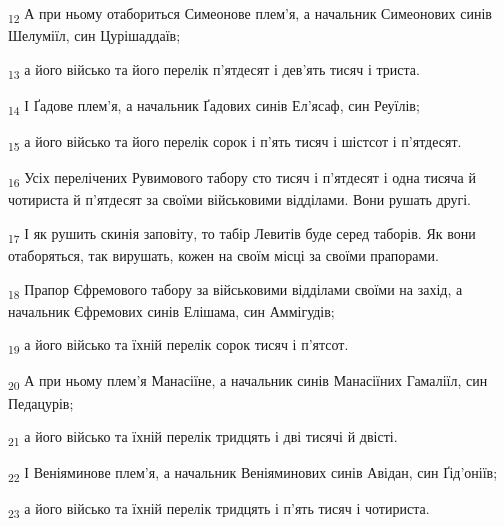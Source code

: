 \begin{tcolorbox}
\textsubscript{12} А при ньому отабориться Симеонове плем'я, а начальник Симеонових синів Шелуміїл, син Цурішаддаїв;
\end{tcolorbox}
\begin{tcolorbox}
\textsubscript{13} а його військо та його перелік п'ятдесят і дев'ять тисяч і триста.
\end{tcolorbox}
\begin{tcolorbox}
\textsubscript{14} І Ґадове плем'я, а начальник Ґадових синів Ел'ясаф, син Реуїлів;
\end{tcolorbox}
\begin{tcolorbox}
\textsubscript{15} а його військо та його перелік сорок і п'ять тисяч і шістсот і п'ятдесят.
\end{tcolorbox}
\begin{tcolorbox}
\textsubscript{16} Усіх перелічених Рувимового табору сто тисяч і п'ятдесят і одна тисяча й чотириста й п'ятдесят за своїми військовими відділами. Вони рушать другі.
\end{tcolorbox}
\begin{tcolorbox}
\textsubscript{17} І як рушить скинія заповіту, то табір Левитів буде серед таборів. Як вони отаборяться, так вирушать, кожен на своїм місці за своїми прапорами.
\end{tcolorbox}
\begin{tcolorbox}
\textsubscript{18} Прапор Єфремового табору за військовими відділами своїми на захід, а начальник Єфремових синів Елішама, син Аммігудів;
\end{tcolorbox}
\begin{tcolorbox}
\textsubscript{19} а його військо та їхній перелік сорок тисяч і п'ятсот.
\end{tcolorbox}
\begin{tcolorbox}
\textsubscript{20} А при ньому плем'я Манасіїне, а начальник синів Манасіїних Гамаліїл, син Педацурів;
\end{tcolorbox}
\begin{tcolorbox}
\textsubscript{21} а його військо та їхній перелік тридцять і дві тисячі й двісті.
\end{tcolorbox}
\begin{tcolorbox}
\textsubscript{22} І Веніяминове плем'я, а начальник Веніяминових синів Авідан, син Ґід'оніїв;
\end{tcolorbox}
\begin{tcolorbox}
\textsubscript{23} а його військо та їхній перелік тридцять і п'ять тисяч і чотириста.
\end{tcolorbox}
